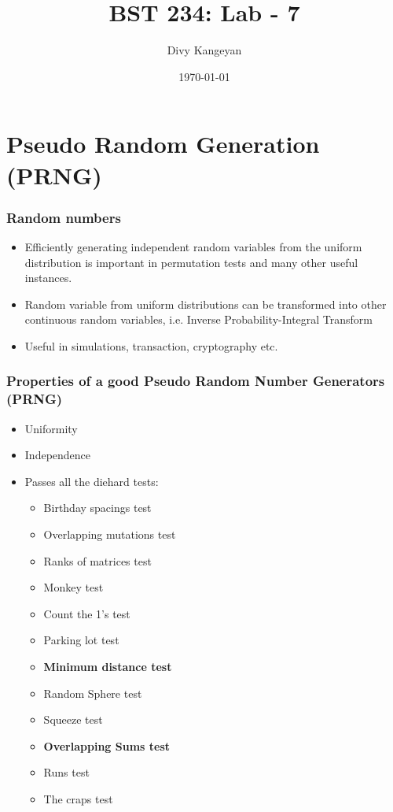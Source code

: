 \documentclass{beamer}
\title[BST 234]{BST 234: Lab - 7}
\author[Divy Kangeyan]{Divy Kangeyan}
\date{\today}
\begin{document}
	
	\begin{frame}
		\titlepage
	\end{frame}
	
	
\section{Pseudo Random Generation (PRNG)}




\begin{frame}
\frametitle{Random numbers}

\begin{itemize}
\item Efficiently generating independent random variables from the uniform distribution is important in permutation tests and many other useful instances.
\item Random variable from uniform distributions can be transformed into other continuous random variables, i.e. Inverse Probability-Integral Transform
\item Useful in simulations, transaction, cryptography etc. 
\end{itemize}

\end{frame}






\begin{frame}
\frametitle{Properties of a good Pseudo Random Number Generators (PRNG)}

\begin{itemize}
\item Uniformity
\item Independence
\item Passes all the diehard tests:
\begin{itemize}
\item Birthday spacings test
\item Overlapping mutations test
\item Ranks of matrices test
\item Monkey test
\item Count the 1's test
\item Parking lot test
\item \textbf{Minimum distance test}
\item Random Sphere test
\item Squeeze test
\item \textbf{Overlapping Sums test}
\item Runs test
\item The craps test
\end{itemize}

\end{itemize}

\end{frame}
\end{document}
